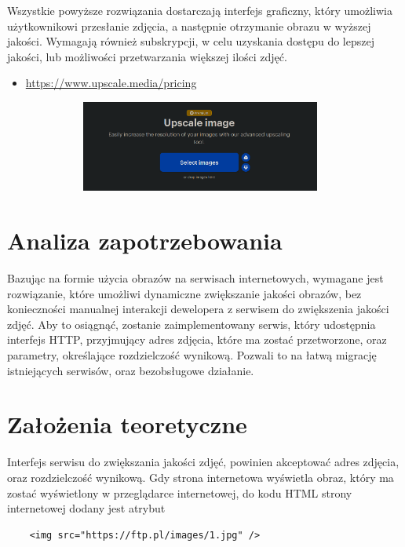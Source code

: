 Wszystkie powyższe rozwiązania dostarczają interfejs graficzny, który umożliwia użytkownikowi przesłanie zdjęcia, a następnie otrzymanie obrazu w wyższej jakości.
\newline
Wymagają również subskrypcji, w celu uzyskania dostępu do lepszej jakości, lub możliwości przetwarzania większej ilości zdjęć.
\begin{itemize}
	\item \href{https://www.upscale.media/pricing}{https://www.upscale.media/pricing}
\end{itemize}
\begin{center}
	{\includegraphics[width=13.0cm, height=3.0cm]{figures/upscale}}
\end{center}

\chapter{Analiza zapotrzebowania}

Bazując na formie użycia obrazów na serwisach internetowych, wymagane jest rozwiązanie, które umożliwi dynamiczne zwiększanie jakości obrazów, bez konieczności manualnej interakcji dewelopera z serwisem do zwiększenia jakości zdjęć.
\newline
Aby to osiągnąć, zostanie zaimplementowany serwis, który udostępnia interfejs HTTP, przyjmujący adres zdjęcia, które ma zostać przetworzone, oraz parametry, określające rozdzielczość wynikową.
\newline
Pozwali to na łatwą migrację istniejących serwisów, oraz bezobsługowe działanie.

\chapter{Założenia teoretyczne}

Interfejs serwisu do zwiększania jakości zdjęć, powinien akceptować adres zdjęcia, oraz rozdzielczość wynikową.
\newline
Gdy strona internetowa wyświetla obraz, który ma zostać wyświetlony w przeglądarce internetowej, do kodu HTML strony internetowej dodany jest atrybut
\newline
\begin{verbatim}
	<img src="https://ftp.pl/images/1.jpg" />
\end{verbatim}

